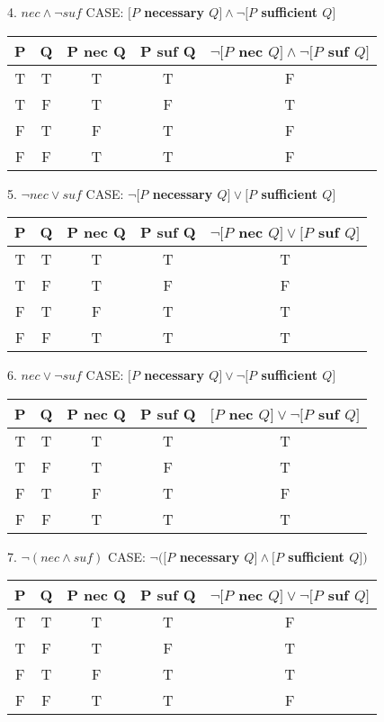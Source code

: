 \begin{definition}
4. $nec \wedge \neg suf$ CASE: {\bf $[P$ necessary $Q] \wedge \neg[P$ sufficient $Q]$} \\
\begin{center}
\begin{tabular}{|c|c|c|c|c|}
\hline 
P & Q & P nec Q & P suf Q & $\neg[P$ nec $Q] \wedge \neg[P$ suf $Q]$  \\ 
\hline 
T & T & T & T & F\\ 
\hline 
T & F & T & F & T\\ 
\hline 
F & T & F & T & F\\ 
\hline 
F & F & T & T & F\\ 
\hline 
\end{tabular} 
\end{center}

5. $\neg nec \vee suf$ CASE: {\bf $\neg[P$ necessary $Q] \vee [P$ sufficient $Q]$} \\
\begin{center}
\begin{tabular}{|c|c|c|c|c|}
\hline 
P & Q & P nec Q & P suf Q & $\neg[P$ nec $Q] \vee [P$ suf $Q]$  \\ 
\hline 
T & T & T & T & T\\ 
\hline 
T & F & T & F & F\\ 
\hline 
F & T & F & T & T\\ 
\hline 
F & F & T & T & T\\ 
\hline 
\end{tabular} 
\end{center}


6. $nec \vee \neg suf$ CASE: {\bf $[P$ necessary $Q] \vee \neg[P$ sufficient $Q]$} \\
\begin{center}
\begin{tabular}{|c|c|c|c|c|}
\hline 
P & Q & P nec Q & P suf Q & $[P$ nec $Q] \vee \neg[P$ suf $Q]$  \\ 
\hline 
T & T & T & T & T\\ 
\hline 
T & F & T & F & T\\ 
\hline 
F & T & F & T & F\\ 
\hline 
F & F & T & T & T\\ 
\hline 
\end{tabular} 
\end{center}


7. $\neg(nec \wedge suf)$ CASE: {\bf $\neg([P$ necessary $Q] \wedge [P$ sufficient $Q])$} \\
\begin{center}
\begin{tabular}{|c|c|c|c|c|}
\hline 
P & Q & P nec Q & P suf Q & $\neg[P$ nec $Q] \vee \neg[P$ suf $Q]$  \\ 
\hline 
T & T & T & T & F\\ 
\hline 
T & F & T & F & T\\ 
\hline 
F & T & F & T & T\\ 
\hline 
F & F & T & T & F\\ 
\hline 
\end{tabular} 
\end{center}


\end{definition}
